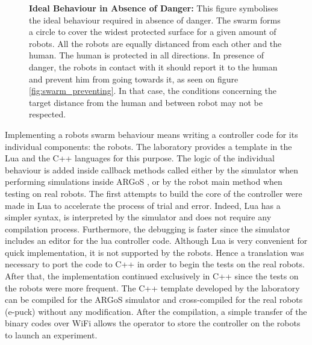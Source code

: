 \documentclass[oneside, a4paper, 12pt]{memoir}
\newcommand{\epuck}[3][0] %
{
	\draw [very thick, fill=white] (#2,#3) circle [radius=0.5];
	\draw [very thick, rotate around={#1:(#2,#3)}] (#2-0.25,#3-0.433) -- (#2,#3+0.45) -- (#2+0.25,#3-0.433);
}
\newcommand{\human}[3][0] %
{
	\draw [very thick, fill=white, rotate around={#1:(#2,#3)}] (#2-1,#3+0.5) ellipse (0.25cm and 0.5cm);
	\draw [very thick, fill=white, rotate around={#1:(#2,#3)}] (#2+1,#3+0.5) ellipse (0.25cm and 0.5cm);
	\draw [very thick, fill=white, rotate around={#1:(#2,#3)}] (#2,#3) ellipse (1.5cm and 0.75cm);
	\draw [thick, fill=white, rotate around={#1:(#2,#3)}] (#2-0.05,#3+1) -- (#2,#3+1.1) -- (#2+0.05,#3+1);
	\draw [very thick, fill=white, rotate around={#1:(#2,#3)}] (#2,#3+0.5) circle [radius=0.5cm];
}
\let\oldCaption\caption
\renewcommand{\caption}[2]{
\oldCaption[#1]{{\small\sffamily\bfseries #1:} #2}
}
\begin{document}
	\begin{figure}[!h]\centering
	\caption{Ideal Behaviour in Absence of Danger}{This figure symbolises the ideal behaviour required in absence of danger. The swarm forms a circle to cover the widest protected surface for a given amount of robots. All the robots are equally distanced from each other and the human. The human is protected in all directions. In presence of danger, the robots in contact with it should report it to the human and prevent him from going towards it, as seen on figure \ref{fig:swarm_preventing}. In that case, the conditions concerning the target distance from the human and between robot may not be respected.}
	\label{fig:circle_shape}
	\end{figure}	
	
	Implementing a robots swarm behaviour means writing a controller code for its individual components: the robots. The laboratory provides a template in the Lua and the C++ languages for this purpose. The logic of the individual behaviour is added inside callback methods called either by the simulator when performing simulations inside ARGoS \citep{pinciroli2012argos}, or by the robot main method when testing on real robots. The first attempts to build the core of the controller were made in Lua to accelerate the process of trial and error. Indeed, Lua has a simpler syntax, is interpreted by the simulator and does not require any compilation process. Furthermore, the debugging is faster since the simulator includes an editor for the lua controller code. Although Lua is very convenient for quick implementation, it is not supported by the robots. Hence a translation was necessary to port the code to C++ in order to begin the tests on the real robots. After that, the implementation continued exclusively in C++ since the tests on the robots were more frequent. The C++ template developed by the laboratory can be compiled for the ARGoS simulator and cross-compiled for the real robots (e-puck) without any modification. After the compilation, a simple transfer of the binary codes over WiFi allows the operator to store the controller on the robots to launch an experiment.\\
	
\end{document}

